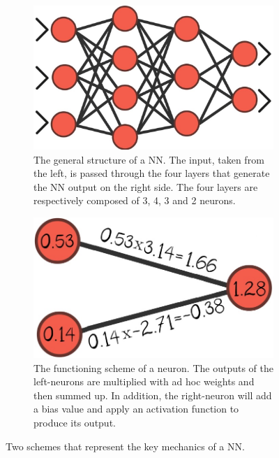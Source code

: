 \begin{figure}[!h]
	\centering
	\begin{subfigure}{0.49\textwidth}
		\includegraphics[width=\linewidth]{images/introduction/howItWorks_NN_layers}
		\captionsetup{margin=0.5cm}
		\caption{The general structure of a NN. The input, taken from the left, is passed through the four layers that generate the NN output on the right side. The four layers are respectively composed of 3, 4, 3 and 2 neurons.}
		\label{fig:howItWorks_NNlayers}
	\end{subfigure}
	\begin{subfigure}{0.49\textwidth}
		\includegraphics[width=\linewidth]{images/introduction/howItWorks_NN_neutron}
		\caption{The functioning scheme of a neuron. The outputs of the left-neurons are multiplied with ad hoc weights and then summed up. In addition, the right-neuron will add a bias value and apply an activation function to produce its output.}
		\label{fig:howItWorks_neutron}
	\end{subfigure}
	\captionsetup{margin=0.5cm}
	\caption{Two schemes that represent the key mechanics of a NN.}
	\label{fig:howItWorks_NN}
\end{figure}


